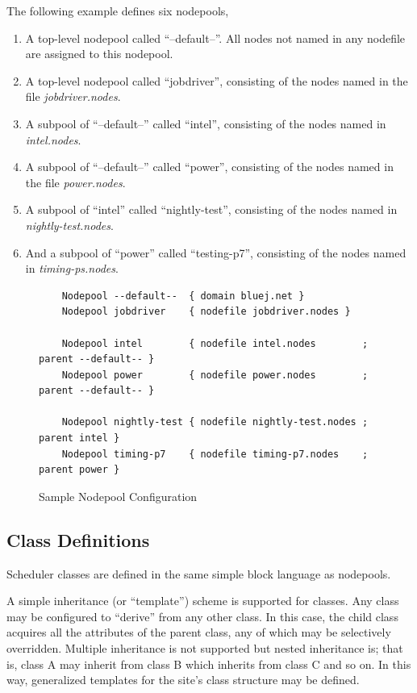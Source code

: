     The following example defines six nodepools, 
    \begin{enumerate}
      \item A top-level nodepool called ``--default--''.  All nodes not named
        in any nodefile are assigned to this nodepool.
      \item A top-level nodepool called ``jobdriver'', consisting of the nodes
        named in the file {\em jobdriver.nodes}.
      \item A subpool of ``--default--'' called ``intel'', consisting of the
        nodes named in {\em intel.nodes}.
      \item A subpool of ``--default--'' called ``power'', consisting of the
        nodes named in the file {\em power.nodes}.
      \item A subpool of ``intel'' called ``nightly-test'', consisting of the 
        nodes named in {\em nightly-test.nodes}.
      \item And a subpool of ``power'' called ``testing-p7'', consisting of the
        nodes named in {\em timing-ps.nodes}.
    \end{enumerate}

    \begin{figure}[H]
    
\begin{verbatim}
    Nodepool --default--  { domain bluej.net }
    Nodepool jobdriver    { nodefile jobdriver.nodes }
    
    Nodepool intel        { nodefile intel.nodes        ; parent --default-- }
    Nodepool power        { nodefile power.nodes        ; parent --default-- }

    Nodepool nightly-test { nodefile nightly-test.nodes ; parent intel }
    Nodepool timing-p7    { nodefile timing-p7.nodes    ; parent power }
\end{verbatim}
      \caption{Sample Nodepool Configuration}
      \label{fig:nodepool.configuration}

    \end{figure}    


    \subsection{Class Definitions}

    Scheduler classes are defined in the same simple block language as
    nodepools.

    A simple inheritance (or ``template'') scheme is supported for classes.  Any
    class may be configured to ``derive'' from any other class.  In this case, the
    child class acquires all the attributes of the parent class, any of which may
    be selectively overridden.  Multiple inheritance is not supported but
    nested inheritance is; that is, class A may inherit from class B which inherits
    from class C and so on. In this way, generalized templates for the site's
    class structure may be defined.  

